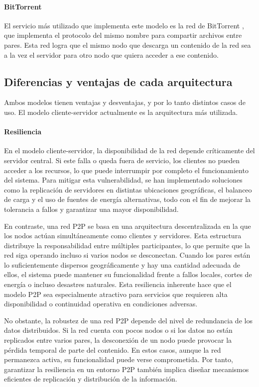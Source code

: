 \paragraph{BitTorrent} El servicio más utilizado que implementa este modelo es la red de BitTorrent \cite{bittorrent}, que implementa el protocolo del mismo nombre para compartir archivos entre pares. Esta red logra que el mismo nodo que descarga un contenido de la red sea a la vez el servidor para otro nodo que quiera acceder a ese contenido. 

\subsection{Diferencias y ventajas de cada arquitectura}
Ambos modelos tienen ventajas y desventajas, y por lo tanto distintos casos de uso. El modelo cliente-servidor actualmente es la arquitectura más utilizada.

\paragraph{Resiliencia}
En el modelo cliente-servidor, la disponibilidad de la red depende críticamente del servidor central. Si este falla o queda fuera de servicio, los clientes no pueden acceder a los recursos, lo que puede interrumpir por completo el funcionamiento del sistema. Para mitigar esta vulnerabilidad, se han implementado soluciones como la replicación de servidores en distintas ubicaciones geográficas, el balanceo de carga \cite{bourke2001server} y el uso de fuentes de energía alternativas, todo con el fin de mejorar la tolerancia a fallos y garantizar una mayor disponibilidad.

En contraste, una red P2P se basa en una arquitectura descentralizada en la que los nodos actúan simultáneamente como clientes y servidores. Esta estructura distribuye la responsabilidad entre múltiples participantes, lo que permite que la red siga operando incluso si varios nodos se desconectan. Cuando los pares están lo suficientemente dispersos geográficamente y hay una cantidad adecuada de ellos, el sistema puede mantener su funcionalidad frente a fallos locales, cortes de energía o incluso desastres naturales. Esta resiliencia inherente hace que el modelo P2P sea especialmente atractivo para servicios que requieren alta disponibilidad o continuidad operativa en condiciones adversas.

No obstante, la robustez de una red P2P depende del nivel de redundancia de los datos distribuidos. Si la red cuenta con pocos nodos o si los datos no están replicados entre varios pares, la desconexión de un nodo puede provocar la pérdida temporal de parte del contenido. En estos casos, aunque la red permanezca activa, su funcionalidad puede verse comprometida. Por tanto, garantizar la resiliencia en un entorno P2P también implica diseñar mecanismos eficientes de replicación y distribución de la información.

